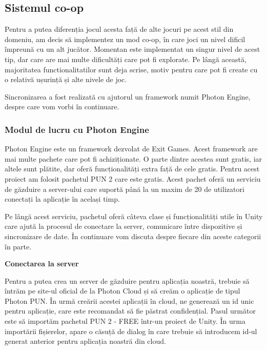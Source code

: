 \documentclass[12pt, a4paper]{article}
\begin{document}
	
	\subsection{Sistemul co-op}
	\label{section: coop}
	
	Pentru a putea diferenția jocul acesta față de alte jocuri pe acest stil din domeniu, am decis să implementez un mod co-op, în care joci un nivel dificil împreună cu un alt jucător. Momentan este implementat un singur nivel de acest tip, dar care are mai multe dificultăți care pot fi explorate. Pe lângă această, majoritatea functionalitatilor sunt deja scrise, motiv pentru care pot fi create cu o relativă ușurință și alte nivele de joc.
	\newline
	
	Sincronizarea a fost realizată cu ajutorul un framework numit Photon Engine, despre care vom vorbi în continuare.
	
	
	
	
	
	\subsubsection{Modul de lucru cu Photon Engine}
	
	Photon Engine este un framework dezvolat de Exit Games. Acest framework are mai multe pachete care pot fi achiziționate. O parte dintre acestea sunt gratis, iar altele sunt plătite, dar oferă funcționalități extra față de cele gratis. Pentru acest proiect am folosit pachetul PUN 2 care este gratis. Acest pachet oferă un serviciu de găzduire a server-ului care suportă până la un maxim de 20 de utilizatori conectați la aplicație în același timp.
	\newline
	
	Pe lângă acest serviciu, pachetul oferă câteva clase și funcționalități utile în Unity care ajută la procesul de conectare la server, comunicare între dispozitive și sincronizare de date. În continuare vom discuta despre fiecare din aceste categorii în parte.
	\newline
	
	
	
	
	
	\textbf{Conectarea la server}
	\newline
	
	Pentru a putea crea un server de găzduire pentru aplicația noastră, trebuie să întrăm pe site-ul oficial de la Photon Cloud și să creăm o aplicație de tipul Photon PUN. În urmă creării acestei aplicații în cloud, ne generează un id unic pentru aplicație, care este recomandat să fie păstrat confidențial. Pasul următor este să importăm pachetul PUN 2 - FREE într-un proiect de Unity. În urma importării fișierelor, apare o căsuță de dialog în care trebuie să introducem id-ul generat anterior pentru aplicația noastră din cloud.
	\newline
	
\end{document}
